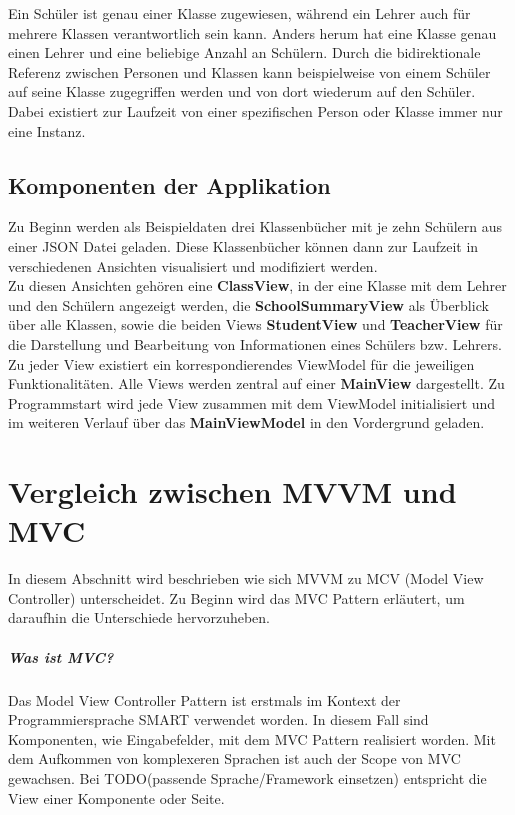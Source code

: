 \documentclass[titlepage=false,12pt]{scrreprt}
\begin{document}
\noindent
Ein Schüler ist genau einer Klasse zugewiesen, während ein Lehrer auch für mehrere Klassen verantwortlich
sein kann. Anders herum hat eine Klasse genau einen Lehrer und eine beliebige Anzahl an Schülern.
Durch die bidirektionale Referenz zwischen Personen und Klassen kann beispielweise von einem Schüler
auf seine Klasse zugegriffen werden und von dort wiederum auf den Schüler. Dabei existiert zur Laufzeit von einer
spezifischen Person oder Klasse immer nur eine Instanz.

\section{Komponenten der Applikation}
Zu Beginn werden als Beispieldaten drei Klassenbücher mit je zehn Schülern aus einer JSON Datei geladen.
Diese Klassenbücher können dann zur Laufzeit in verschiedenen Ansichten visualisiert und modifiziert werden.\\
\noindent
Zu diesen Ansichten gehören eine \textbf{ClassView}, in der eine Klasse mit dem Lehrer und den Schülern
angezeigt werden, die \textbf{SchoolSummaryView} als Überblick über alle Klassen, sowie die beiden Views
\textbf{StudentView} und \textbf{TeacherView} für die Darstellung und Bearbeitung von Informationen eines
Schülers bzw. Lehrers. Zu jeder View existiert ein korrespondierendes ViewModel für die jeweiligen Funktionalitäten.
Alle Views werden zentral auf einer \textbf{MainView} dargestellt. Zu Programmstart wird jede View zusammen
mit dem ViewModel initialisiert und im weiteren Verlauf über das \textbf{MainViewModel} in den
Vordergrund geladen.


\chapter{Vergleich zwischen MVVM und MVC}

In diesem Abschnitt wird beschrieben wie sich MVVM zu MCV (Model View Controller) unterscheidet. 
Zu Beginn wird das MVC Pattern erläutert, um daraufhin die Unterschiede hervorzuheben. 

\paragraph{Was ist MVC?}

Das Model View Controller Pattern ist erstmals im Kontext der Programmiersprache SMART verwendet 
worden. In diesem Fall sind Komponenten, wie Eingabefelder, mit dem MVC Pattern realisiert worden.
Mit dem Aufkommen von komplexeren Sprachen ist auch der Scope von MVC gewachsen. Bei TODO(passende Sprache/Framework einsetzen)
entspricht die View einer Komponente oder Seite.
\end{document}
